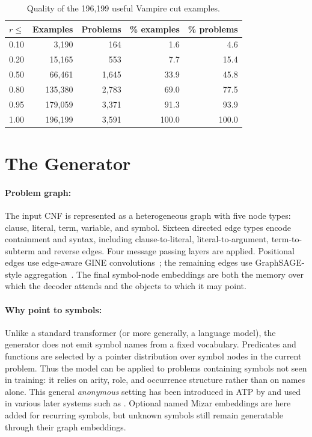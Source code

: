 \documentclass{easychair}
\newcommand{\Vampire}{Vampire\xspace}
\newcommand{\Mizar}{Mizar\xspace}
\begin{document}
\begin{table}[t]
\centering
\caption{Quality of the 196,199 useful \Vampire cut examples.}
\label{tab:ratios}
\small
\begin{tabular}{rrrrr}
\toprule
$r \leq$ & Examples & Problems & \% examples & \% problems \\
\midrule
0.10 & 3,190 & 164 & 1.6 & 4.6 \\
0.20 & 15,165 & 553 & 7.7 & 15.4 \\
0.50 & 66,461 & 1,645 & 33.9 & 45.8 \\
0.80 & 135,380 & 2,783 & 69.0 & 77.5 \\
0.95 & 179,059 & 3,371 & 91.3 & 93.9 \\
1.00 & 196,199 & 3,591 & 100.0 & 100.0 \\
\bottomrule
\end{tabular}
\end{table}

\section{The Generator}
\label{sec:generator}

\paragraph{Problem graph:}
The input CNF is represented as a heterogeneous graph with five node
types: clause, literal, term, variable, and symbol.  Sixteen directed
edge types encode containment and syntax, including clause-to-literal,
literal-to-argument, term-to-subterm and reverse edges.  Four message
passing layers are applied.  Positional edges use edge-aware GINE
convolutions~\cite{Hu2020}; the remaining edges use GraphSAGE-style
aggregation~\cite{Hamilton2017}.  The final symbol-node embeddings are
both the memory over which the decoder attends and the objects to which
it may point.

\paragraph{Why point to symbols:}
Unlike a standard transformer (or more generally, a language model), the generator does not emit symbol names from a fixed vocabulary.
Predicates and functions are selected by a pointer distribution over
symbol nodes in the current problem.  Thus the model can be applied to
problems containing symbols not seen in training: it relies on arity,
role, and occurrence structure rather than on names alone.  This general \emph{anonymous} setting has been introduced in ATP by
\cite{OlsakKaliszykUrban2020} and used in various later systems such as \cite{PiepenbrockUrbanKorovinOlsakHeskesJanota2025}.
Optional
named \Mizar embeddings are here added for recurring symbols, but unknown
symbols still remain generatable through their graph embeddings. 
\end{document}
